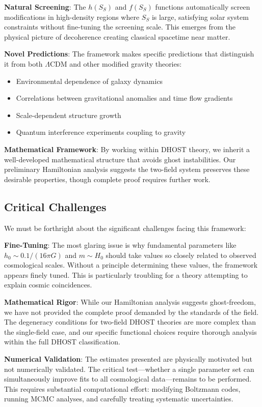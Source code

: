 \documentclass[12pt]{article}
\begin{document}
\textbf{Natural Screening}: The $h(S_S)$ and $f(S_S)$ functions automatically screen modifications in high-density regions where $S_S$ is large, satisfying solar system constraints without fine-tuning the screening scale. This emerges from the physical picture of decoherence creating classical spacetime near matter.

\textbf{Novel Predictions}: The framework makes specific predictions that distinguish it from both $\Lambda$CDM and other modified gravity theories:
\begin{itemize}
    \item Environmental dependence of galaxy dynamics
    \item Correlations between gravitational anomalies and time flow gradients
    \item Scale-dependent structure growth
    \item Quantum interference experiments coupling to gravity
\end{itemize}

\textbf{Mathematical Framework}: By working within DHOST theory, we inherit a well-developed mathematical structure that avoids ghost instabilities. Our preliminary Hamiltonian analysis suggests the two-field system preserves these desirable properties, though complete proof requires further work.

\subsection{Critical Challenges}

We must be forthright about the significant challenges facing this framework:

\textbf{Fine-Tuning}: The most glaring issue is why fundamental parameters like $h_0 \sim 0.1/(16\pi G)$ and $m \sim H_0$ should take values so closely related to observed cosmological scales. Without a principle determining these values, the framework appears finely tuned. This is particularly troubling for a theory attempting to explain cosmic coincidences.

\textbf{Mathematical Rigor}: While our Hamiltonian analysis suggests ghost-freedom, we have not provided the complete proof demanded by the standards of the field. The degeneracy conditions for two-field DHOST theories are more complex than the single-field case, and our specific functional choices require thorough analysis within the full DHOST classification.

\textbf{Numerical Validation}: The estimates presented are physically motivated but not numerically validated. The critical test—whether a single parameter set can simultaneously improve fits to all cosmological data—remains to be performed. This requires substantial computational effort: modifying Boltzmann codes, running MCMC analyses, and carefully treating systematic uncertainties.
\end{document}
